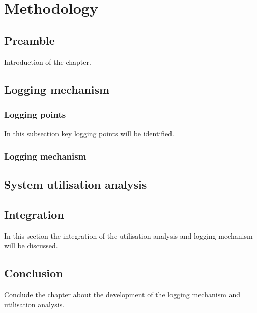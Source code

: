 \chapter{Methodology}
\label{chap:2}

\section{Preamble}
Introduction of the chapter.

\section{Logging mechanism}

\subsection{Logging points}
In this subsection key logging points will be identified.

\subsection{Logging mechanism}

\section{System utilisation analysis}

\section{Integration}
In this section the integration of the utilisation analysis and logging mechanism will be discussed.

\section{Conclusion}
Conclude the chapter about the development of the logging mechanism and utilisation analysis.